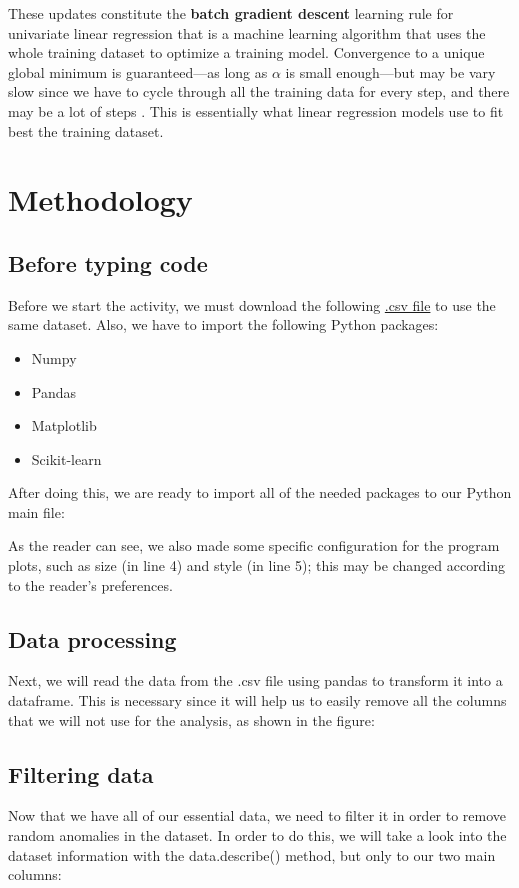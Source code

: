 \documentclass[10pt]{article}
\begin{document}
These updates constitute the \textbf{batch gradient descent} learning rule for univariate linear regression \cite{ai} that is a machine learning algorithm that uses the whole training dataset to optimize a training model. Convergence to a unique global minimum is guaranteed---as long as $\alpha$ is small enough---but may be vary slow since we have to cycle through all the training data for every step, and there may be a lot of steps \cite{ai}. This is essentially what linear regression models use to fit best the training dataset.

\newpage

\section{Methodology}
\subsection{Before typing code}
Before we start the activity, we must download the following \href{http://www.aprendemachinelearning.com/articulos_ml/}{.csv file} \cite{aprendeML} to use the same dataset. Also, we have to import the following Python packages:
\begin{itemize}
  \item Numpy
  \item Pandas
  \item Matplotlib
  \item Scikit-learn
\end{itemize}
After doing this, we are ready to import all of the needed packages to our Python main file: \par
As the reader can see, we also made some specific configuration for the program plots, such as size (in line 4) and style (in line 5); this may be changed according to the reader's preferences.

\subsection{Data processing}
Next, we will read the data from the .csv file using pandas to transform it into a dataframe. This is necessary since it will help us to easily remove all the columns that we will not use for the analysis, as shown in the figure: \par

\subsection{Filtering data}
Now that we have all of our essential data, we need to filter it in order to remove random anomalies in the dataset. In order to do this, we will take a look into the dataset information with the data.describe() method, but only to our two main columns:
\end{document}
